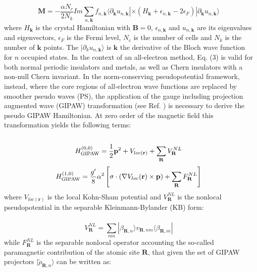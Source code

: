 \documentclass[final,3p,times,twocolumn]{elsarticle}
\newcounter{bla}
\begin{document}
\begin{small}
\begin{equation}
\mathbf{M}=-\frac{\alpha N_{c}}{2N_{k}} Im\sum\limits_{n,\mathbf{k}} f_{n,\mathbf{k}}  \langle \partial_{\mathbf{k}} u_{n,\mathbf{k}}|\times \left ( H_{\mathbf{k}}+\epsilon_{n,\mathbf{k}} -2\epsilon_{F} \right ) |  \partial_{\mathbf{k}} u_{n,\mathbf{k}} \rangle
\end{equation} 
where $H_{\mathbf{k}}$ is the crystal Hamiltonian with $\mathbf{B}=0$, $\epsilon_{n,\mathbf{k}}$ and $u_{n,\mathbf{k}}$ are its eigenvalues and eigenvectors, $\epsilon_{F}$ is the Fermi level, $N_{c}$ is the number of cells and $N_{k}$ is the number of $\mathbf{k}$ points. The $ |  \partial_{k} u_{n,\mathbf{k}} \rangle$ is $\mathbf{k}$ the derivative of the Bloch wave function for $n$ occupied states. 
In the context of an all-electron method, Eq. (3) is valid for both normal periodic insulators and metals, as well as Chern insulators with a non-null Chern invariant. In the norm-conserving pseudopotential framework, instead, where the core regions of all-electron wave functions are replaced by smoother pseudo waves (PS), the application of the gauge including projection augmented wave (GIPAW) transformation (see Ref. \cite{PhysRevB.63.245101}) is necessary to derive the pseudo GIPAW Hamiltonian. At zero order of the magnetic field this transformation yields the following terms:\\ \\
\begin{equation}
H_{\rm{GIPAW}}^{(0,0)}=\frac{1}{2}\mathbf{p}^{2}+V_{loc(\mathbf{r})}+\sum_{\mathbf{R}}^{}V_{\mathbf{R}}^{NL}
\end{equation} 
\begin{equation}
H_{\rm{GIPAW}}^{(1,0)}=\frac{g'}{8}\alpha ^{2}\left [ \mathbf{\sigma } \cdot (\nabla V_{loc}(\mathbf{r})\times \mathbf{p})+\sum_{\mathbf{R}}^{}F_{\mathbf{R}}^{NL} \right ]
\end{equation} 
where $V_{loc(\mathbf{r})} $ is the local Kohn-Sham potential and $ V_{\mathbf{R}}^{NL} $ is the nonlocal pseudopotential in the separable Kleinmann-Bylander (KB) form: \\ \\
\begin{equation}
V_{\mathbf{R}}^{NL}=\sum_{nm}^{}|\beta_{\mathbf{R},n}  \rangle v_{\mathbf{R},nm} \langle \beta_{\mathbf{R},m}|
\end{equation} 
while $F_{\mathbf{R}}^{NL}$ is the separable nonlocal operator accounting the so-called paramagnetic contribution of the atomic site $\mathbf{R}$, that given the set of GIPAW projectors $|\widetilde{\rho}_{\mathbf{R},n}  \rangle $ can be written as:\\

\end{small}
\end{document}
